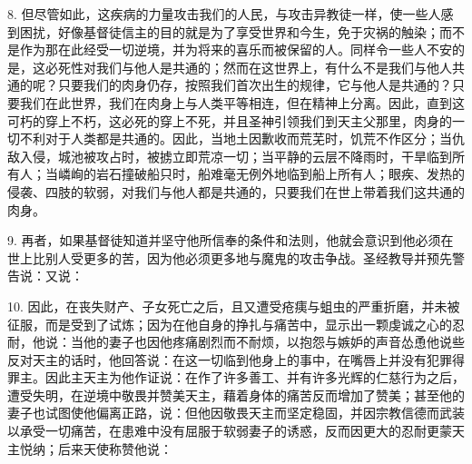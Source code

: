 8. 但尽管如此，这疾病的力量攻击我们的人民，与攻击异教徒一样，使一些人感到困扰，好像基督徒信主的目的就是为了享受世界和今生，免于灾祸的触染；而不是作为那在此经受一切逆境，并为将来的喜乐而被保留的人。同样令一些人不安的是，这必死性对我们与他人是共通的；然而在这世界上，有什么不是我们与他人共通的呢？只要我们的肉身仍存，按照我们首次出生的规律，它与他人是共通的？只要我们在此世界，我们在肉身上与人类平等相连，但在精神上分离。因此，直到这可朽的穿上不朽，这必死的穿上不死，并且圣神引领我们到天主父那里，肉身的一切不利对于人类都是共通的。因此，当地土因歉收而荒芜时，饥荒不作区分；当仇敌入侵，城池被攻占时，被掳立即荒凉一切；当平静的云层不降雨时，干旱临到所有人；当嶙峋的岩石撞破船只时，船难毫无例外地临到船上所有人；眼疾、发热的侵袭、四肢的软弱，对我们与他人都是共通的，只要我们在世上带着我们这共通的肉身。\par

9. 再者，如果基督徒知道并坚守他所信奉的条件和法则，他就会意识到他必须在世上比别人受更多的苦，因为他必须更多地与魔鬼的攻击争战。圣经教导并预先警告说：\newline{}\newline{}又说：\newline{}\newline{}\par

10. 因此，在丧失财产、子女死亡之后，且又遭受疮痍与蛆虫的严重折磨，并未被征服，而是受到了试炼；因为在他自身的挣扎与痛苦中，显示出一颗虔诚之心的忍耐，他说：当他的妻子也因他疼痛剧烈而不耐烦，以抱怨与嫉妒的声音怂恿他说些反对天主的话时，他回答说：在这一切临到他身上的事中，在嘴唇上并没有犯罪得罪主。因此主天主为他作证说：在作了许多善工、并有许多光辉的仁慈行为之后，遭受失明，在逆境中敬畏并赞美天主，藉着身体的痛苦反而增加了赞美；甚至他的妻子也试图使他偏离正路，说：但他因敬畏天主而坚定稳固，并因宗教信德而武装以承受一切痛苦，在患难中没有屈服于软弱妻子的诱惑，反而因更大的忍耐更蒙天主悦纳；后来天使称赞他说：\par

